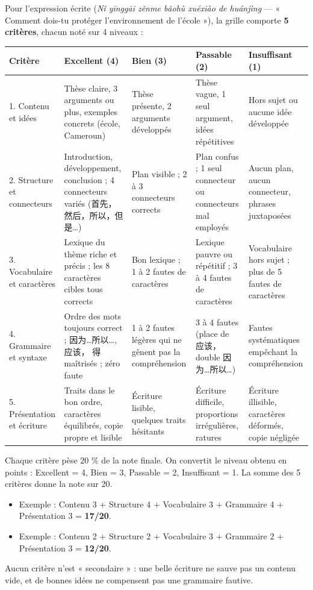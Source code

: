 \documentclass[11pt]{article}
\newcommand{\cle}[1]{{\popxbold\color{popdark}#1}}
\newcommand{\zh}[1]{\ifmmode\text{#1}\else{#1}\fi}
\begin{document}
Pour l'expression écrite \zh{你应该怎么保护学校的环境} (\emph{Nǐ yīnggāi zěnme bǎohù xuéxiào de huánjìng} — « Comment dois-tu protéger l'environnement de l'école »), la grille comporte \textbf{5 critères}, chacun noté sur 4 niveaux :

\begin{center}
\begin{tabularx}{\linewidth}{|X|X|X|X|X|}
\hline
\rowcolor{popblueL} \textbf{Critère} & \textbf{Excellent (4)} & \textbf{Bien (3)} & \textbf{Passable (2)} & \textbf{Insuffisant (1)} \\
\hline
1. Contenu et idées & Thèse claire, 3 arguments ou plus, exemples concrets (école, Cameroun) & Thèse présente, 2 arguments développés & Thèse vague, 1 seul argument, idées répétitives & Hors sujet ou aucune idée développée \\
\hline
2. Structure et connecteurs & Introduction, développement, conclusion ; 4 connecteurs variés (首先，然后，所以，但是…) & Plan visible ; 2 à 3 connecteurs corrects & Plan confus ; 1 seul connecteur ou connecteurs mal employés & Aucun plan, aucun connecteur, phrases juxtaposées \\
\hline
3. Vocabulaire et caractères & Lexique du thème riche et précis ; les 8 caractères cibles tous corrects & Bon lexique ; 1 à 2 fautes de caractères & Lexique pauvre ou répétitif ; 3 à 4 fautes de caractères & Vocabulaire hors sujet ; plus de 5 fautes de caractères \\
\hline
4. Grammaire et syntaxe & Ordre des mots toujours correct ; 因为…所以…, 应该， 得 maîtrisés ; zéro faute & 1 à 2 fautes légères qui ne gênent pas la compréhension & 3 à 4 fautes (place de 应该， double 因为…所以…) & Fautes systématiques empêchant la compréhension \\
\hline
5. Présentation et écriture & Traits dans le bon ordre, caractères équilibrés, copie propre et lisible & Écriture lisible, quelques traits hésitants & Écriture difficile, proportions irrégulières, ratures & Écriture illisible, caractères déformés, copie négligée \\
\hline
\end{tabularx}
\end{center}

\begin{propriete}
Chaque critère pèse \cle{20 \%} de la note finale. On convertit le niveau obtenu en points : Excellent = 4, Bien = 3, Passable = 2, Insuffisant = 1. La somme des 5 critères donne la note sur 20.
\begin{itemize}
\item Exemple : Contenu 3 + Structure 4 + Vocabulaire 3 + Grammaire 4 + Présentation 3 = \textbf{17/20}.
\item Exemple : Contenu 2 + Structure 2 + Vocabulaire 3 + Grammaire 2 + Présentation 3 = \textbf{12/20}.
\end{itemize}
Aucun critère n'est « secondaire » : une belle écriture ne sauve pas un contenu vide, et de bonnes idées ne compensent pas une grammaire fautive.
\end{propriete}
\end{document}
